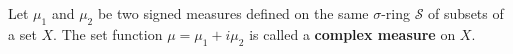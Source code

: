 Let $\mu_1$ and $\mu_2$ be two signed measures defined on the same $\sigma$-ring $\mathcal{S}$ of subsets of a set $X$. The set function $\mu = \mu_1 + i\mu_2$ is called a \textbf{complex measure} on $X$.
